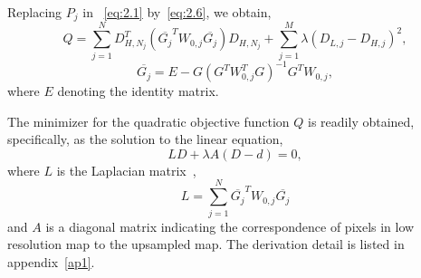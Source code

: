 Replacing $P_{j}$ in ~\eqref{eq:2.1} by~\eqref{eq:2.6}, we obtain,
\begin{equation}
Q = \sum_{j=1}^{N}{D_{H,N_{j}}^{T}(\overline{G_{j}}^{T}W_{0,j}\overline{G_{j}})D_{H,N_{j}}}+\sum_{j=1}^{M}{\lambda(D_{L,j}-D_{H,j})^2},
\label{eq:2.7}
\end{equation}
\begin{equation}
\overline{G_{j}}= E-G(G^{T}W_{0,j}^{T}G)^{-1}G^{T}W_{0,j},
\end{equation}
where $E$ denoting the identity matrix.

The minimizer for the quadratic objective function $Q$ is readily obtained, specifically, as the solution to the linear equation,
\begin{equation}
LD+\lambda A(D-d) = 0,
\label{eq:2.8}
\end{equation}
where $L$ is the Laplacian matrix~\cite{merris1994laplacian},
\begin{equation}
L= \sum_{j=1}^{N}{\overline{G_{j}}^{T}W_{0,j}\overline{G_{j}}}
\label{eq:lpl}
\end{equation}
and $A$ is a diagonal matrix indicating the correspondence of pixels in low resolution map to the upsampled map. The derivation detail is listed in appendix~\ref{ap1}.


